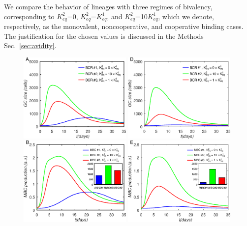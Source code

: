 \documentclass[utf8]{frontiersHLTH}%
\newcommand{\mk}[1]{} %
\newcommand{\comment}[1]{} %
\newcommand{\Sec}[1]{Sec.~\ref{sec:#1}}
\renewcommand{\sec}[1]{\Sec{#1}}
\newcommand{\hfig}[1]{#1} %
\begin{document}
We compare the behavior
of lineages with three regimes of bivalency, corresponding to $K^2_{eq}$=0,
$K^2_{eq}$=$K^1_{eq}$, and $K^2_{eq}$=10$K^1_{eq}$, which we denote,
respectively, as the monovalent, noncooperative, and cooperative binding
cases. The justification for the chosen values is discussed in the Methods \sec{avidity}.
%
\mk{[Would put in SI.]}\comment{moved to methods}
\hfig{
\begin{figure}
\centering
\includegraphics[width=0.49\textwidth]{../fig4abc/gcsize.eps}
\includegraphics[width=0.49\textwidth]{../fig4def/gcsize.eps}
\includegraphics[width=0.49\textwidth]{../fig4abc/dmbc.eps}
\includegraphics[width=0.49\textwidth]{../fig4def/dmbc.eps}

\end{figure}}
\end{document}
